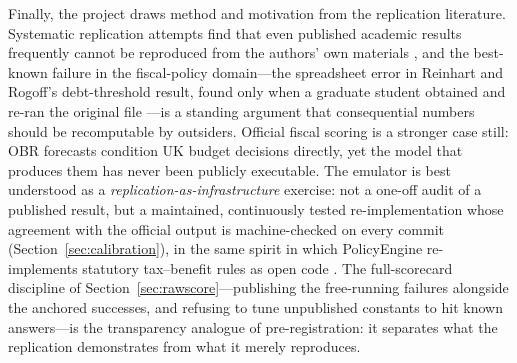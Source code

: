 Finally, the project draws method and motivation from the replication literature. Systematic replication attempts find that even published academic results frequently cannot be reproduced from the authors' own materials \citep{chang2015}, and the best-known failure in the fiscal-policy domain---the spreadsheet error in Reinhart and Rogoff's debt-threshold result, found only when a graduate student obtained and re-ran the original file \citep{herndon2014}---is a standing argument that consequential numbers should be recomputable by outsiders. Official fiscal scoring is a stronger case still: OBR forecasts condition UK budget decisions directly, yet the model that produces them has never been publicly executable. The emulator is best understood as a \emph{replication-as-infrastructure} exercise: not a one-off audit of a published result, but a maintained, continuously tested re-implementation whose agreement with the official output is machine-checked on every commit (Section~\ref{sec:calibration}), in the same spirit in which PolicyEngine re-implements statutory tax--benefit rules as open code \citep{policyengine}. The full-scorecard discipline of Section~\ref{sec:rawscore}---publishing the free-running failures alongside the anchored successes, and refusing to tune unpublished constants to hit known answers---is the transparency analogue of pre-registration: it separates what the replication demonstrates from what it merely reproduces.
